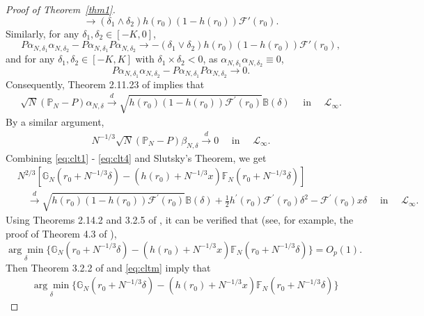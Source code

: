 \documentclass[12pt]{amsart}
\theoremstyle{plain}
\theoremstyle{remark}
\numberwithin{equation}{section}
\begin{document}
\begin{proof}[Proof of Theorem~\ref{thm1}]
\[\rightarrow
(\delta_1\wedge \delta_2)h(r_0)(1-h(r_0))\mathcal{F}'(r_0).
\]
Similarly, for any \(\delta_1,\delta_2 \in [-K,0]\),
\[
P \alpha_{N,\delta_1} \alpha_{N,\delta_2} - P \alpha_{N,\delta_1} P \alpha_{N,\delta_2}
\rightarrow
-(\delta_1\vee \delta_2)h(r_0)(1-h(r_0))\mathcal{F}'(r_0),
\]
and for any \(\delta_1,\delta_2 \in [-K,K]\) with $\delta_1\times\delta_2 < 0$, as $\alpha_{N,\delta_1}\alpha_{N,\delta_2} \equiv 0$, 
\[
P \alpha_{N,\delta_1} \alpha_{N,\delta_2} - P \alpha_{N,\delta_1} P \alpha_{N,\delta_2}
\rightarrow 0.
\]
Consequently, Theorem 2.11.23 of \cite{MR1385671} implies that
\begin{align}\label{eq:clt3}
\sqrt{N}(\mathbb{P}_N-P){\alpha}_{N,\delta} \xrightarrow{d} \sqrt{h(r_0)(1-h(r_0))\mathcal{F}^{\prime}\left(r_{0}\right)} \mathbb{B}(\delta)
\quad \text{ in } \quad \mathcal{L}_\infty. 
\end{align}
By a similar argument,
\begin{align}\label{eq:clt4}
    N^{-1/3}\sqrt{N}(\mathbb{P}_N-P){\beta}_{N,\delta} \xrightarrow{d} 0
\quad \text{ in } \quad \mathcal{L}_\infty. 
\end{align}
Combining \eqref{eq:clt1} - \eqref{eq:clt4} and Slutsky's Theorem, we get
\begin{align}\label{eq:cltm}
& N^{2/3}\left[\mathbb{G}_{N}\left(r_{0}+N^{-1/3} \delta\right)-\left(h\left(r_{0}\right)+N^{-1 / 3} x\right) \mathbb{F}_{N}\left(r_{0}+N^{-1/3}\delta\right)\right] \nonumber\\
& \quad \stackrel{d}{\rightarrow} \sqrt{h(r_0)(1-h(r_0))\mathcal{F}^{\prime}\left(r_{0}\right)} \mathbb{B}(\delta)+\frac{1}{2} h^{\prime}\left(r_{0}\right) \mathcal{F}^{\prime}\left(r_{0}\right) \delta^{2}-\mathcal{F}^{\prime}\left(r_{0}\right)x\delta \quad \text { in } \quad \mathcal{L}_\infty.
\end{align}
Using Theorems 2.14.2 and 3.2.5 of \cite{MR1385671}, it can be verified that (see, for example, the proof of Theorem 4.3 of \cite{WellnerZhang1998}),
\[\underset{\delta}{\operatorname{arg}\operatorname{min}} \Bigg\{\mathbb{G}_{N}\left(r_{0}+N^{-1/3} 
\delta\right)-\left(h\left(r_{0}\right)+N^{-1/3}x\right)\mathbb{F}_{N}\left(r_{0}+N^{-1/3}\delta\right)\Bigg\} = O_p(1).\]
Then Theorem 3.2.2 of \cite{MR1385671} and \eqref{eq:cltm} imply that
\begin{align}\label{eq:cltm1}
&\underset{\delta}{\operatorname{arg}\operatorname{min}} \Bigg\{\mathbb{G}_{N}\left(r_{0}+N^{-1/3} 
\delta\right)-\left(h\left(r_{0}\right)+N^{-1/3}x\right)\mathbb{F}_{N}\left(r_{0}+N^{-1/3}\delta\right)\Bigg\} \nonumber

\end{align}
\end{proof}
\end{document}
